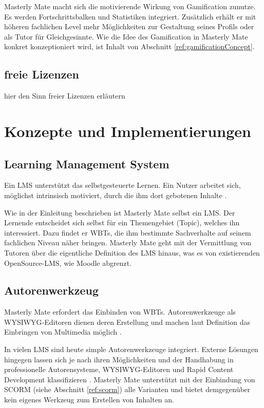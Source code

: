 Masterly Mate macht sich die motivierende Wirkung von Gamification zunutze. Es
werden Fortschrittsbalken und Statistiken integriert. Zusätzlich erhält er mit
höheren fachlichen Level mehr Möglichkeiten zur Gestaltung seines Profils oder
als Tutor für Gleichgesinnte. Wie die Idee des Gamification in Masterly Mate
konkret konzeptioniert wird, ist Inhalt von Abschnitt
\ref{ref:gamificationConcept}.

\begin{k}
\subsection{freie Lizenzen}\label{ref:freeLicenses}
hier den Sinn freier Lizenzen erläutern
\end{k}

\section{Konzepte und Implementierungen}
\subsection{Learning Management System}
Ein LMS unterstützt das selbstgesteuerte Lernen. Ein Nutzer arbeitet sich,
möglichst intrinsisch motiviert, durch die ihm dort gebotenen Inhalte
\cite{wendt:2003}.

Wie in der Einleitung beschrieben ist Masterly Mate selbst ein LMS. Der Lernende
entscheidet sich selbst für ein Themengebiet (Topic), welches ihn interessiert.
Dazu findet er WBTs, die ihm bestimmte Sachverhalte auf seinem fachlichen Niveau
näher bringen. Masterly Mate geht mit der Vermittlung von Tutoren über die
eigentliche Definition des LMS hinaus, was es von existierenden OpenSource-LMS,
wie Moodle abgrenzt.

\subsection{Autorenwerkzeug}
Masterly Mate erfordert das Einbinden von WBTs. Autorenwerkzeuge als
\ac{WYSIWYG}-Editoren dienen deren Erstellung und machen laut Definition das
Einbringen von Multimedia möglich \cite{niegemann:2004}. 

In vielen LMS sind heute simple Autorenwerkzeuge integriert. Externe Lösungen
hingegen lassen sich je nach ihren Möglichkeiten und der Handhabung in
professionelle Autorensysteme, WYSIWYG-Editoren und Rapid Content Development
klassifizieren \cite{niegemann:2004}. Masterly Mate unterstützt mit der
Einbindung von SCORM (siehe Abschnitt \ref{ref:scorm}) alle Varianten und bietet
demgegenüber kein eigenes Werkzeug zum Erstellen von Inhalten an.

